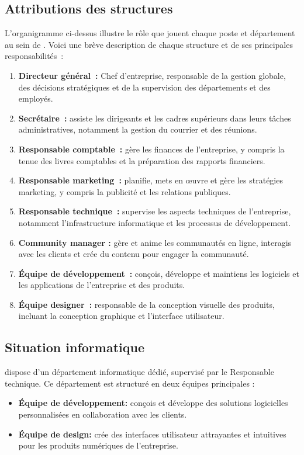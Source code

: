 \subsection{Attributions des structures}
L’organigramme ci-dessus illustre le rôle que jouent chaque poste et
département au sein de \firm. Voici une brève description de chaque
structure et de ses principales responsabilités :
\begin{enumerate}
  \item \textbf{Directeur général :} Chef d’entreprise, responsable de la gestion globale,
    des décisions stratégiques et de la supervision des départements et des employés.

  \item \textbf{Secrétaire :} assiste les dirigeants et les cadres supérieurs dans leurs
    tâches administratives, notamment la gestion du courrier et des réunions.

  \item \textbf{Responsable comptable :} gère les finances de l’entreprise, y compris la
    tenue des livres comptables et la préparation des rapports financiers.

  \item \textbf{Responsable marketing :} planifie, mets en œuvre et gère les stratégies
    marketing, y compris la publicité et les relations publiques.

  \item \textbf{Responsable technique :} supervise les aspects techniques de l’entreprise,
    notamment l’infrastructure informatique et les processus de développement.

  \item \textbf{Community manager :} gère et anime les communautés en ligne, interagis
    avec les clients et crée du contenu pour engager la communauté.

  \item \textbf{Équipe de développement :} conçois, développe et maintiens les logiciels
    et les applications de l’entreprise et des produits.

  \item \textbf{Équipe designer :} responsable de la conception visuelle des produits,
    incluant la conception graphique et l’interface utilisateur.

\end{enumerate}

\subsection{Situation informatique}
\firm dispose d’un département informatique dédié, supervisé par le Responsable
technique. Ce département est structuré en deux équipes principales :
\begin{itemize}

  \item \textbf{Équipe de développement:} conçois et développe des solutions logicielles
    personnalisées en collaboration avec les clients.
  \item \textbf{Équipe de design:} crée des interfaces utilisateur attrayantes et intuitives
    pour les produits numériques de l’entreprise.
\end{itemize}

